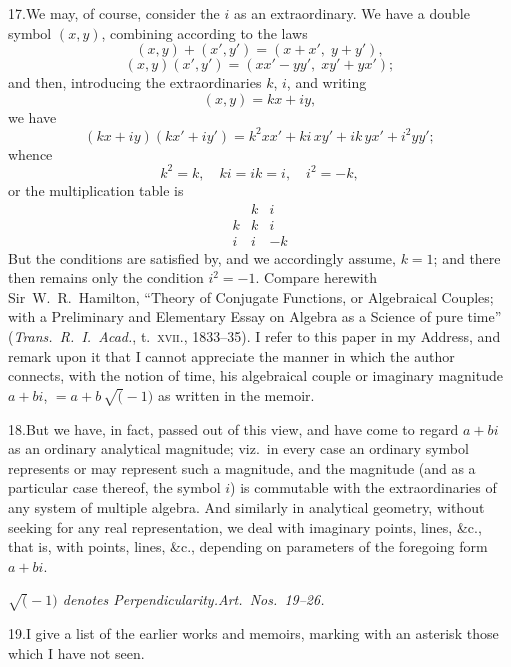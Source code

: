 \documentclass[11pt]{article}
\begin{document}
17.\quad We may, of course, consider the $i$ as an extraordinary. We have a double symbol $(x, y)$, combining according to the laws
\[
(x, y) + (x', y') = (x + x',\; y + y'),
\]
\[
(x, y)(x', y') = (xx' - yy',\; xy' + yx');
\]
and then, introducing the extraordinaries $k$, $i$, and writing
\[
(x, y) = kx + iy,
\]
we have
\[
(kx + iy)(kx' + iy') = k^{2}xx' + ki\,xy' + ik\,yx' + i^{2}yy';
\]
whence
\[
k^{2} = k,\quad ki = ik = i,\quad i^{2} = -k,
\]
or the multiplication table is
\[
\begin{array}{c|cc}
 & k & i \\ \hline
k & k & i \\
i & i & -k
\end{array}
\]
But the conditions are satisfied by, and we accordingly assume, $k = 1$; and there then remains only the condition $i^{2} = -1$. Compare herewith Sir~W.~R.~Hamilton, ``Theory of Conjugate Functions, or Algebraical Couples; with a Preliminary and Elementary Essay on Algebra as a Science of pure time'' (\textit{Trans.\ R.~I.\ Acad.}, t.~\textsc{xvii}., 1833--35). I refer to this paper in my Address, and remark upon it that I cannot appreciate the manner in which the author connects, with the notion of time, his algebraical couple or imaginary magnitude $a + bi$, $= a + b\,\surd(-1)$ as written in the memoir.

18.\quad But we have, in fact, passed out of this view, and have come to regard $a + bi$ as an ordinary analytical magnitude; viz.\ in every case an ordinary symbol represents or may represent such a magnitude, and the magnitude (and as a particular case thereof, the symbol $i$) is commutable with the extraordinaries of any system of multiple algebra. And similarly in analytical geometry, without seeking for any real representation, we deal with imaginary points, lines, \&c., that is, with points, lines, \&c., depending on parameters of the foregoing form $a + bi$.

\medskip

\begin{center}\textit{$\surd(-1)$ denotes Perpendicularity.\quad Art.~Nos.~19--26.}\end{center}

\medskip

19.\quad I give a list of the earlier works and memoirs, marking with an asterisk those which I have not seen.

\smallskip
\end{document}
